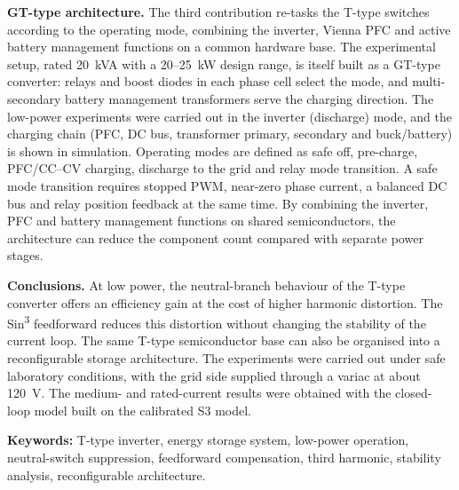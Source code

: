 \begin{summary}
\textbf{GT-type architecture.} The third contribution re-tasks the T-type switches according to the operating mode, combining the inverter, Vienna PFC and active battery management functions on a common hardware base. The experimental setup, rated 20~kVA with a 20--25~kW design range, is itself built as a GT-type converter: relays and boost diodes in each phase cell select the mode, and multi-secondary battery management transformers serve the charging direction. The low-power experiments were carried out in the inverter (discharge) mode, and the charging chain (PFC, DC bus, transformer primary, secondary and buck/battery) is shown in simulation. Operating modes are defined as safe off, pre-charge, PFC/CC--CV charging, discharge to the grid and relay mode transition. A safe mode transition requires stopped PWM, near-zero phase current, a balanced DC bus and relay position feedback at the same time. By combining the inverter, PFC and battery management functions on shared semiconductors, the architecture can reduce the component count compared with separate power stages.

\textbf{Conclusions.} At low power, the neutral-branch behaviour of the T-type converter offers an efficiency gain at the cost of higher harmonic distortion. The Sin\textsuperscript{3} feedforward reduces this distortion without changing the stability of the current loop. The same T-type semiconductor base can also be organised into a reconfigurable storage architecture. The experiments were carried out under safe laboratory conditions, with the grid side supplied through a variac at about 120~V. The medium- and rated-current results were obtained with the closed-loop model built on the calibrated S3 model.

\textbf{Keywords:} T-type inverter, energy storage system, low-power operation, neutral-switch suppression, feedforward compensation, third harmonic, stability analysis, reconfigurable architecture.
\end{summary}
